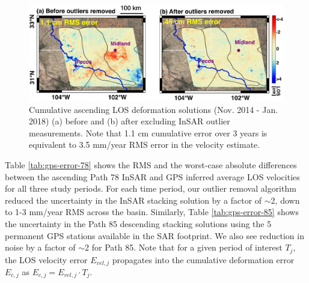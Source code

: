 \begin{figure}
	\centering
	\includegraphics[width=0.99\linewidth]{figures/chapter4-grl/outlier-bottom-only.pdf}
	\caption[Tropospheric outlier removal comparison]{
		Cumulative ascending LOS deformation solutions (Nov. 2014 - Jan. 2018) 
		(a) before and (b) after excluding InSAR outlier measurements. Note that 1.1 cm cumulative error over 3 years is equivalent to 3.5 mm/year RMS error in the velocity estimate.}
	\label{fig:ch4-outliers-visual}
\end{figure}









Table \ref{tab:gps-error-78} shows the RMS and the worst-case absolute differences between the ascending Path 78 InSAR and GPS inferred average LOS velocities for all three study periods. 
For each time period, our outlier removal algorithm reduced the uncertainty in the InSAR stacking solution by a factor of $\sim$2, down to 1-3 mm/year RMS across the basin. 
Similarly, Table \ref{tab:gps-error-85} shows the uncertainty in the Path 85 descending stacking solutions using the 5 permanent GPS stations available in the SAR footprint.
We also see reduction in noise by a factor of $\sim$2 for Path 85.
Note that for a given period of interest $T_j$, the LOS velocity error $ E_{vel,j} $  propagates into the cumulative deformation error $ E_{c, j} $ as $ E_{c,j} = E_{vel,j} \cdot T_j $. 



